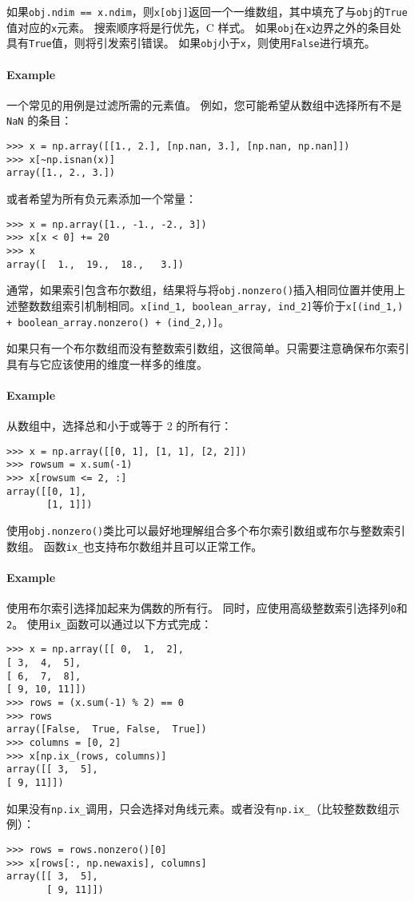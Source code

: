 \documentclass[../main.tex]{subfile}
\begin{document}
如果\lstinline{obj.ndim == x.ndim}，则\lstinline{x[obj]}返回一个一维数组，其中填充了与\lstinline{obj}的\lstinline{True}值对应的\lstinline{x}元素。 搜索顺序将是行优先，C 样式。 如果\lstinline{obj}在\lstinline{x}边界之外的条目处具有\lstinline{True}值，则将引发索引错误。 如果\lstinline{obj}小于\lstinline{x}，则使用\lstinline{False}进行填充。

\paragraph{Example}一个常见的用例是过滤所需的元素值。 例如，您可能希望从数组中选择所有不是 \lstinline{NaN} 的条目：
\begin{lstlisting}
>>> x = np.array([[1., 2.], [np.nan, 3.], [np.nan, np.nan]])
>>> x[~np.isnan(x)]
array([1., 2., 3.])
\end{lstlisting}
或者希望为所有负元素添加一个常量：
\begin{lstlisting}
>>> x = np.array([1., -1., -2., 3])
>>> x[x < 0] += 20
>>> x
array([  1.,  19.,  18.,   3.])
\end{lstlisting}

通常，如果索引包含布尔数组，结果将与将\lstinline{obj.nonzero()}插入相同位置并使用上述整数数组索引机制相同。\lstinline{x[ind_1, boolean_array, ind_2]}等价于\lstinline{x[(ind_1,) + boolean_array.nonzero() + (ind_2,)]}。

如果只有一个布尔数组而没有整数索引数组，这很简单。只需要注意确保布尔索引具有与它应该使用的维度一样多的维度。

\paragraph{Example}从数组中，选择总和小于或等于 2 的所有行：
\begin{lstlisting}
>>> x = np.array([[0, 1], [1, 1], [2, 2]])
>>> rowsum = x.sum(-1)
>>> x[rowsum <= 2, :]
array([[0, 1],
       [1, 1]])
\end{lstlisting}

使用\lstinline{obj.nonzero()}类比可以最好地理解组合多个布尔索引数组或布尔与整数索引数组。 函数\lstinline{ix_}也支持布尔数组并且可以正常工作。

\paragraph{Example}使用布尔索引选择加起来为偶数的所有行。 同时，应使用高级整数索引选择列\lstinline{0}和\lstinline{2}。 使用\lstinline{ix_}函数可以通过以下方式完成：
\begin{lstlisting}
>>> x = np.array([[ 0,  1,  2],
[ 3,  4,  5],
[ 6,  7,  8],
[ 9, 10, 11]])
>>> rows = (x.sum(-1) % 2) == 0
>>> rows
array([False,  True, False,  True])
>>> columns = [0, 2]
>>> x[np.ix_(rows, columns)]
array([[ 3,  5],
[ 9, 11]])
\end{lstlisting}
如果没有\lstinline{np.ix_}调用，只会选择对角线元素。或者没有\lstinline{np.ix_}（比较整数数组示例）：
\begin{lstlisting}
>>> rows = rows.nonzero()[0]
>>> x[rows[:, np.newaxis], columns]
array([[ 3,  5],
       [ 9, 11]])
\end{lstlisting}
\end{document}
